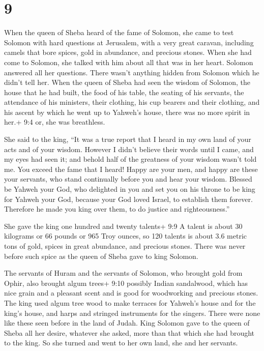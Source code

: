 \hypertarget{section-8}{%
\section{9}\label{section-8}}

 When the queen of Sheba heard of the fame of Solomon, she
came to test Solomon with hard questions at Jerusalem, with a very great
caravan, including camels that bore spices, gold in abundance, and
precious stones. When she had come to Solomon, she talked with him about
all that was in her heart.  Solomon answered all her
questions. There wasn't anything hidden from Solomon which he didn't
tell her.  When the queen of Sheba had seen the wisdom of
Solomon, the house that he had built,  the food of his
table, the seating of his servants, the attendance of his ministers,
their clothing, his cup bearers and their clothing, and his ascent by
which he went up to Yahweh's house, there was no more spirit in her.+
9:4 or, she was breathless.

 She said to the king, ``It was a true report that I heard
in my own land of your acts and of your wisdom.  However I
didn't believe their words until I came, and my eyes had seen it; and
behold half of the greatness of your wisdom wasn't told me. You exceed
the fame that I heard!  Happy are your men, and happy are
these your servants, who stand continually before you and hear your
wisdom.  Blessed be Yahweh your God, who delighted in you
and set you on his throne to be king for Yahweh your God, because your
God loved Israel, to establish them forever. Therefore he made you king
over them, to do justice and righteousness.''

 She gave the king one hundred and twenty talents+ 9:9 A
talent is about 30 kilograms or 66 pounds or 965 Troy ounces, so 120
talents is about 3.6 metric tons of gold, spices in great abundance, and
precious stones. There was never before such spice as the queen of Sheba
gave to king Solomon.

 The servants of Huram and the servants of Solomon, who
brought gold from Ophir, also brought algum trees+ 9:10 possibly Indian
sandalwood, which has nice grain and a pleasant scent and is good for
woodworking and precious stones.  The king used algum tree
wood to make terraces for Yahweh's house and for the king's house, and
harps and stringed instruments for the singers. There were none like
these seen before in the land of Judah.  King Solomon gave
to the queen of Sheba all her desire, whatever she asked, more than that
which she had brought to the king. So she turned and went to her own
land, she and her servants.

